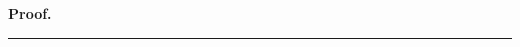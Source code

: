 \documentclass[oneside,final]{ucr}
\newenvironment{proof}[1][Proof]{\textbf{#1.} }{\ \rule{0.5em}{0.5em}}
\begin{document}
\begin{proof}
\end{proof}
\end{document}

